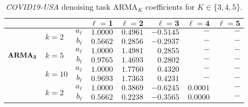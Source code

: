 \documentclass[a4paper, 12pt]{article}
\begin{document}
\begin{table}[ht]
	\centering{}
	\color{blue}
	\caption{\textit{COVID19-USA} denoising task \(\text{ARMA}_K\) coefficients for \(K\in \{ 3,4,5 \} \).}\label{tab:denoise:covid:arma_coeff}
	\begin{tabular}{clrrrrrr}\toprule
		                                                         &                             &            & \(\boldsymbol{\ell=1}\) & \(\boldsymbol{\ell=2}\) & \(\boldsymbol{\ell=3}\) & \(\boldsymbol{\ell=4}\) & \(\boldsymbol{\ell=5}\) \\ \midrule
		                                                         & \multirow{2}{*}{\(k = 2\)}  & \(a_\ell\) & \(1.0000\)              & \(0.4961\)              & \(-0.5145\)             & \( - \)                 & \( - \)                 \\
		                                                         &                             & \(b_\ell\) & \(0.5662\)              & \(0.2856\)              & \(-0.2937\)             & \( - \)                 & \( - \)                 \\ \cmidrule(l){2-8}
		\multirow{2}{*}{\(\boldsymbol{\text{\textbf{ARMA}}_3}\)} & \multirow{2}{*}{\(k = 5\)}  & \(a_\ell\) & \(1.0000\)              & \(1.4981\)              & \(0.2855\)              & \( - \)                 & \( - \)                 \\
		                                                         &                             & \(b_\ell\) & \(0.9765\)              & \(1.4693\)              & \(0.2802\)              & \( - \)                 & \( - \)                 \\ \cmidrule(l){2-8}
		                                                         & \multirow{2}{*}{\(k = 10\)} & \(a_\ell\) & \(1.0000\)              & \(1.7760\)              & \(0.4320\)              & \( - \)                 & \( - \)                 \\
		                                                         &                             & \(b_\ell\) & \(0.9693\)              & \(1.7363\)              & \(0.4231\)              & \( - \)                 & \( - \)                 \\ \midrule
		                                                         & \multirow{2}{*}{\(k = 2\)}  & \(a_\ell\) & \(1.0000\)              & \(0.3869\)              & \(-0.6245\)             & \(0.0001\)              & \( - \)                 \\
		                                                         &                             & \(b_\ell\) & \(0.5662\)              & \(0.2238\)              & \(-0.3565\)             & \(0.0000\)              & \( - \)                 \\ \cmidrule(l){2-8}

\end{tabular}
\end{table}
\end{document}
